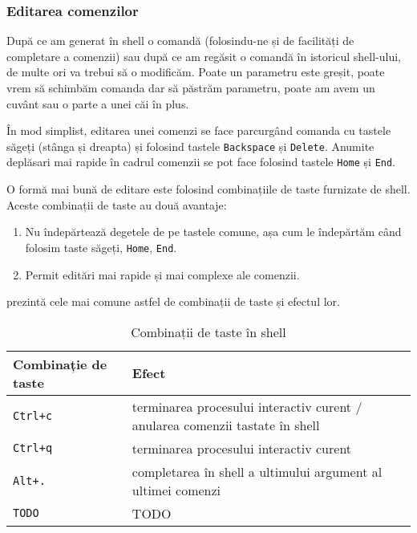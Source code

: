 \subsubsection{Editarea comenzilor}
\label{sec:cli-editing}

După ce am generat în shell o comandă (folosindu-ne și de facilități de
completare a comenzii) sau după ce am regăsit o comandă în istoricul
shell-ului, de multe ori va trebui să o modificăm. Poate un parametru este
greșit, poate vrem să schimbăm comanda dar să păstrăm parametru, poate am avem
un cuvânt sau o parte a unei căi în plus.

În mod simplist, editarea unei comenzi se face parcurgând comanda cu tastele
săgeți (stânga și dreapta) și folosind tastele \texttt{Backspace} și \texttt{Delete}. Anumite
deplăsari mai rapide în cadrul comenzii se pot face folosind tastele \texttt{Home} și
\texttt{End}.

O formă mai bună de editare este folosind combinațiile de taste furnizate de
shell. Aceste combinații de taste au două avantaje:

\begin{enumerate}
	\item Nu îndepărtează degetele de pe tastele comune, așa cum le
          îndepărtăm când folosim taste săgeți, \texttt{Home}, \texttt{End}.
	\item Permit editări mai rapide și mai complexe ale comenzii.
\end{enumerate}

 prezintă cele mai comune astfel de combinații de taste și efectul lor.

\begin{table}[!htb]
  \caption{Combinații de taste în shell}
  \begin{center}
    \begin{tabular}{ p{} p{} }
      \toprule
        \textbf{Combinație de taste} &
        \textbf{Efect} \\
      \midrule
        \texttt{Ctrl+c} &
        terminarea procesului interactiv curent / anularea comenzii tastate în shell \\

        \texttt{Ctrl+q} &
        terminarea procesului interactiv curent \\

        \texttt{Alt+.} &
        completarea în shell a ultimului argument al ultimei comenzi \\

        \texttt{TODO} &
        TODO \\
      \bottomrule
    \end{tabular}
    \label{tab:cli:key-bindings}
  \end{center}
\end{table}

